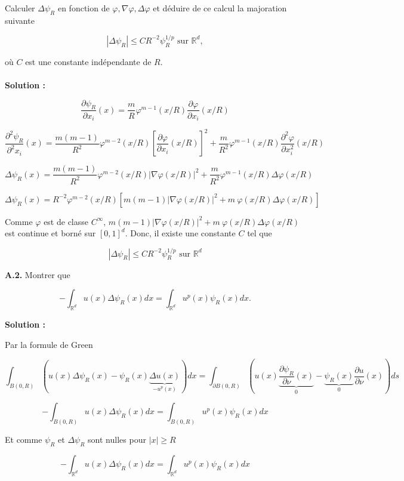 \documentclass[10pt,a4paper,oneside]{article}
\begin{document}
Calculer $\Delta \psi_R$ en fonction de $\varphi, \nabla \varphi, \Delta \varphi$ et déduire de ce calcul la majoration suivante

\[ |\Delta \psi_R| \leq CR^{-2} \psi^{1 / p}_R \text{ sur } \mathbb{R}^d, \]

où $C$ est une constante indépendante de $R$.
\\ \\
\textbf{Solution :}

\[ \frac{\partial \psi_R}{\partial x_i}(x) = \frac{m}{R} \varphi^{m - 1}(x / R) \frac{\partial \varphi}{\partial x_i}(x / R) \]

\[ \frac{\partial^2 \psi_R}{\partial^2 x_i}(x) = \frac{m(m - 1)}{R^2} \varphi^{m - 2}(x / R) \left[ \frac{\partial \varphi}{\partial x_i}(x / R) \right]^2 + \frac{m}{R^2} \varphi^{m - 1}(x / R) \frac{\partial^2 \varphi}{\partial x_i^2}(x / R) \]

\[ \Delta \psi_R(x) = \frac{m(m - 1)}{R^2} \varphi^{m - 2}(x / R) |\nabla \varphi(x / R)|^2 + \frac{m}{R^2} \varphi^{m - 1}(x / R) \Delta \varphi(x / R) \]

\[ \boxed{ \Delta \psi_R(x) = R^{-2} \varphi^{m - 2}(x / R) \left[ m(m - 1)  |\nabla \varphi(x / R)|^2 + m\ \varphi(x / R) \Delta \varphi(x / R) \right] } \]

Comme $\varphi$ est de classe $C^\infty$, $m(m - 1)  |\nabla \varphi(x / R)|^2 + m\ \varphi(x / R) \Delta \varphi(x / R)$ est continue et borné sur $[0,1]^d$. Donc, il existe une constante $C$ tel que

\[ |\Delta \psi_R| \leq CR^{-2}\psi_R^{1 / p} \text{ sur } \mathbb{R}^d \]

\textbf{A.2.} Montrer que

\[ -\int_{\mathbb{R}^d} u(x) \Delta \psi_R(x) dx  = \int_{\mathbb{R}^d} u^p(x) \psi_R(x) dx. \]

\textbf{Solution :}

Par la formule de Green

\[ \int_{B(0,R)} (u(x) \Delta \psi_R(x) - \psi_R(x) \underbrace{\Delta u(x)}_{-u^p(x)})dx = \int_{\partial B(0,R)} \left( u(x) \underbrace{\dfrac{\partial \psi_R}{\partial \nu}(x)}_{0} - \underbrace{\psi_R(x)}_{0} \dfrac{\partial u}{\partial \nu}(x) \right) ds \]

\[ -\int_{B(0,R)} u(x) \Delta \psi_R(x) dx = \int_{B(0,R)} u^p(x) \psi_R(x) dx \]

Et comme $\psi_R$ et $\Delta \psi_R$ sont nulles pour $|x| \geq R$

\[ \boxed{ -\int_{\mathbb{R}^d} u(x) \Delta \psi_R(x) dx = \int_{\mathbb{R}^d} u^p(x) \psi_R(x) dx } \]
\end{document}
